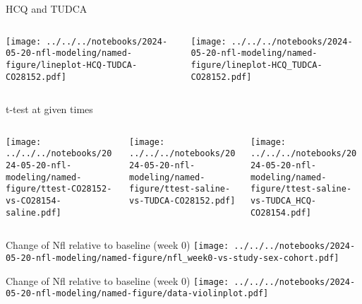 \documentclass[aspectratio=169]{beamer}
\begin{document}
\begin{frame}{HCQ and TUDCA}
\begin{columns}[t]
\begin{column}{0.6\textwidth}

  \texttt{[image: ../../../notebooks/2024-05-20-nfl-modeling/named-figure/lineplot-HCQ-TUDCA-CO28152.pdf]}
\end{column}

\begin{column}{0.4\textwidth}

  \texttt{[image: ../../../notebooks/2024-05-20-nfl-modeling/named-figure/lineplot-HCQ\_TUDCA-CO28152.pdf]}
\end{column}
\end{columns}
\end{frame}


\begin{frame}{t-test at given times}
\begin{columns}[t]

\begin{column}{0.33\textwidth}

  \texttt{[image: ../../../notebooks/2024-05-20-nfl-modeling/named-figure/ttest-CO28152-vs-CO28154-saline.pdf]}
\end{column}

\begin{column}{0.33\textwidth}

  \texttt{[image: ../../../notebooks/2024-05-20-nfl-modeling/named-figure/ttest-saline-vs-TUDCA-CO28152.pdf]}
\end{column}

\begin{column}{0.33\textwidth}

  \texttt{[image: ../../../notebooks/2024-05-20-nfl-modeling/named-figure/ttest-saline-vs-TUDCA\_HCQ-CO28154.pdf]}
\end{column}
\end{columns}
\end{frame}


\begin{frame}{Change of Nfl relative to baseline (week 0)}
  \texttt{[image: ../../../notebooks/2024-05-20-nfl-modeling/named-figure/nfl\_week0-vs-study-sex-cohort.pdf]}
\end{frame}

\begin{frame}{Change of Nfl relative to baseline (week 0)}
  \texttt{[image: ../../../notebooks/2024-05-20-nfl-modeling/named-figure/data-violinplot.pdf]}
\end{frame}
\end{document}
